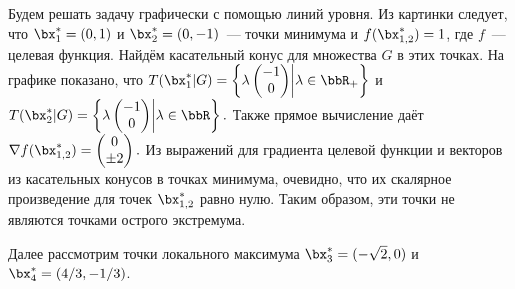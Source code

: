 \documentclass[12pt]{article}
\begin{document}
Будем решать задачу графически с помощью линий уровня.
Из картинки следует, что $\bx^*_1 = (0,1)$ и $\bx^*_2 = (0, -1)$~--- точки минимума и $f(\bx^*_{1,2}) = 1$, где $f$~--- целевая функция.
Найдём касательный конус для множества $G$ в этих точках.
На графике показано, что $T(\bx^*_1|G) = \left\{\lambda 
\begin{pmatrix}
-1\\
0
\end{pmatrix} 
\middle | \lambda \in \bbR_+
\right\}$
и $T(\bx^*_2|G) = \left\{\lambda 
\begin{pmatrix}
-1\\
0
\end{pmatrix} 
\middle | \lambda \in \bbR 
\right\}.$
Также прямое вычисление даёт $\nabla f(\bx^*_{1,2}) = 
\begin{pmatrix}
0\\
\pm 2
\end{pmatrix}.$
Из выражений для градиента целевой функции и векторов из касательных конусов в точках минимума, очевидно, что их скалярное произведение для точек $\bx^*_{1,2}$ равно нулю.
Таким образом, эти точки не являются точками острого экстремума.

Далее рассмотрим точки локального максимума $\bx^*_3 = (-\sqrt{2}, 0)$ и $\bx^*_4 = (4/3, -1/3)$.
\end{document}
